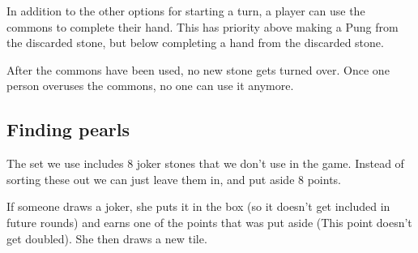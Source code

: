 \documentclass{article}
\begin{document}
In addition to the other options for starting a turn, a player can use the commons to complete their hand.
This has priority above making a Pung from the discarded stone, but below completing a hand from the discarded stone.

After the commons have been used, no new stone gets turned over.
Once one person overuses the commons, no one can use it anymore.

\subsection{Finding pearls}
The set we use includes 8 joker stones that we don't use in the game. Instead of sorting these out we can just leave them in, and put aside 8 points.

If someone draws a joker, she puts it in the box (so it doesn't get included in future rounds) and earns one of the points that was put aside (This point doesn't get doubled). She then draws a new tile.

\end{document}
